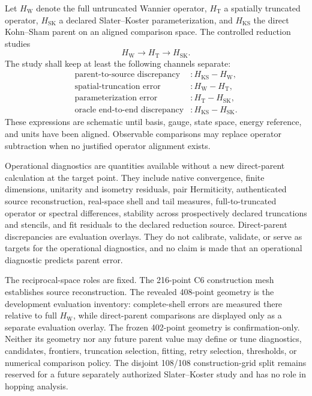 \documentclass[11pt]{report}
\begin{document}
Let $H_{\mathrm{W}}$ denote the full untruncated Wannier operator,
$H_{\mathrm{T}}$ a spatially truncated operator, $H_{\mathrm{SK}}$ a declared
Slater--Koster parameterization, and $H_{\mathrm{KS}}$ the direct Kohn--Sham parent on
an aligned comparison space.  The controlled reduction studies
\begin{equation}
  H_{\mathrm{W}}\longrightarrow H_{\mathrm{T}}
  \longrightarrow H_{\mathrm{SK}}.
\end{equation}
The study shall keep at least the following channels separate:
\begin{align}
  \text{parent-to-source discrepancy} &: H_{\mathrm{KS}}-H_{\mathrm{W}},\\
  \text{spatial-truncation error} &: H_{\mathrm{W}}-H_{\mathrm{T}},\\
  \text{parameterization error} &: H_{\mathrm{T}}-H_{\mathrm{SK}},\\
  \text{oracle end-to-end discrepancy} &: H_{\mathrm{KS}}-H_{\mathrm{SK}}.
\end{align}
These expressions are schematic until basis, gauge, state space, energy reference, and
units have been aligned.  Observable comparisons may replace operator subtraction when
no justified operator alignment exists.

Operational diagnostics are quantities available without a new direct-parent
calculation at the target point.  They include native convergence, finite dimensions,
unitarity and isometry residuals, pair Hermiticity, authenticated source reconstruction,
real-space shell and tail measures, full-to-truncated operator or spectral differences,
stability across prospectively declared truncations and stencils, and fit residuals to
the declared reduction source.  Direct-parent discrepancies are evaluation overlays.
They do not calibrate, validate, or serve as targets for the operational diagnostics,
and no claim is made that an operational diagnostic predicts parent error.

The reciprocal-space roles are fixed.  The 216-point C6 construction mesh establishes
source reconstruction.  The revealed 408-point geometry is the development evaluation
inventory: complete-shell errors are measured there relative to full
$H_{\mathrm{W}}$, while direct-parent comparisons are displayed only as a separate
evaluation overlay.  The frozen 402-point geometry is confirmation-only.  Neither its
geometry nor any future parent value may define or tune diagnostics, candidates,
frontiers, truncation selection, fitting, retry selection, thresholds, or numerical
comparison policy.  The disjoint 108/108 construction-grid split remains reserved for a
future separately authorized Slater--Koster study and has no role in hopping analysis.
\end{document}
